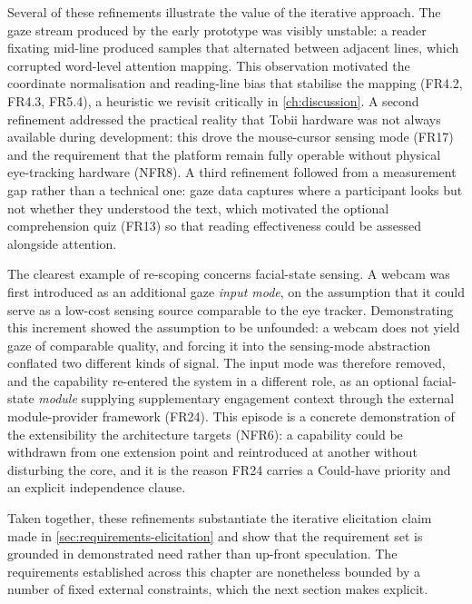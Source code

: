 \endgroup

Several of these refinements illustrate the value of the iterative approach.
The gaze stream produced by the early prototype was visibly unstable: a reader fixating mid-line produced samples that alternated between adjacent lines, which corrupted word-level attention mapping.
This observation motivated the coordinate normalisation and reading-line bias that stabilise the mapping (FR4.2, FR4.3, FR5.4), a heuristic we revisit critically in \cref{ch:discussion}.
A second refinement addressed the practical reality that Tobii hardware was not always available during development: this drove the mouse-cursor sensing mode (FR17) and the requirement that the platform remain fully operable without physical eye-tracking hardware (NFR8).
A third refinement followed from a measurement gap rather than a technical one: gaze data captures where a participant looks but not whether they understood the text, which motivated the optional comprehension quiz (FR13) so that reading effectiveness could be assessed alongside attention.

The clearest example of re-scoping concerns facial-state sensing.
A webcam was first introduced as an additional gaze \emph{input mode}, on the assumption that it could serve as a low-cost sensing source comparable to the eye tracker.
Demonstrating this increment showed the assumption to be unfounded: a webcam does not yield gaze of comparable quality, and forcing it into the sensing-mode abstraction conflated two different kinds of signal.
The input mode was therefore removed, and the capability re-entered the system in a different role, as an optional facial-state \emph{module} supplying supplementary engagement context through the external module-provider framework (FR24).
This episode is a concrete demonstration of the extensibility the architecture targets (NFR6): a capability could be withdrawn from one extension point and reintroduced at another without disturbing the core, and it is the reason FR24 carries a Could-have priority and an explicit independence clause.

Taken together, these refinements substantiate the iterative elicitation claim made in \cref{sec:requirements-elicitation} and show that the requirement set is grounded in demonstrated need rather than up-front speculation.
The requirements established across this chapter are nonetheless bounded by a number of fixed external constraints, which the next section makes explicit.
